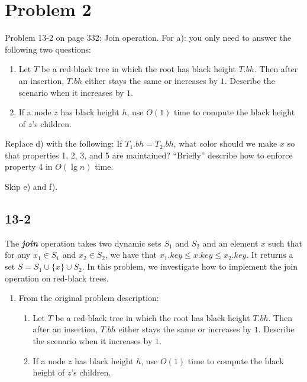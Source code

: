 \documentclass{../../class}
\begin{document}
\newpage
\section*{Problem 2}
\begin{tcolorbox}
    Problem 13-2 on page 332: Join operation. For a): you only need to answer the following two questions:
    \begin{enumerate}
        \item Let $T$ be a red-black tree in which the root has black height $T.bh$. Then after an insertion, $T.bh$ either stays the same or increases by $1$. Describe the scenario when it increases by $1$.
        \item If a node $z$ has black height $h$, use $O(1)$ time to compute the black height of $z$'s children.
    \end{enumerate} 
    Replace d) with the following: If $T_1.bh = T_2.bh$, what color should we make $x$ so that properties 1, 2, 3, and 5 are maintained? \enquote{Briefly} describe how to enforce property 4 in $O(\lg{n})$ time.

    Skip e) and f).
\end{tcolorbox}

\subsection*{13-2}
The \textbf{\textit{join}} operation takes two dynamic sets $S_1$ and $S_2$ and an element $x$ such that for any $x_1 \in S_1$ and $x_2 \in S_2$, we have that $x_1.key \leq x.key \leq x_2.key$. It returns a set $S = S_1 \cup \{x\} \cup S_2$. In this problem, we investigate how to implement the join operation on red-black trees.
\begin{enumerate}[label=\textbf{\textit{\alph*}}.]
    \item From the original problem description:
    \begin{enumerate}[1.]
        \item Let $T$ be a red-black tree in which the root has black height $T.bh$. Then after an insertion, $T.bh$ either stays the same or increases by $1$. Describe the scenario when it increases by $1$.
        \item If a node $z$ has black height $h$, use $O(1)$ time to compute the black height of $z$'s children.
    \end{enumerate} 
\end{enumerate}
\end{document}
